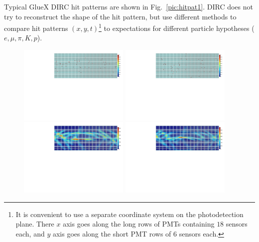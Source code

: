 Typical GlueX DIRC hit patterns are shown in Fig.~\ref{pic:hitpat1}. DIRC does not try to reconstruct the shape of the hit pattern, but use different methods to compare hit patterns $(x,y,t)$\footnote{It is convenient to use a separate coordinate system on the photodetection plane. There $x$ axis goes along the long rows of PMTs containing $18$ sensors each, and $y$ axis goes along the short PMT rows of $6$ sensors each.} to expectations for different particle hypotheses ($e, \mu, \pi, K, p$).

\begin{figure}[!h]
\centering
\includegraphics[angle=0,width=0.47\textwidth]{pics/single_ka_th8_phi158_p2.pdf} \hspace{0.5cm} \includegraphics[angle=0,width=0.47\textwidth]{pics/single_pi_th8_phi158_p2.pdf}\\
\includegraphics[angle=0,width=0.47\textwidth]{pics/ka_th8_phi158_p2.pdf} \hspace{0.5cm} \includegraphics[angle=0,width=0.47\textwidth]{pics/pi_th8_phi158_p2.pdf}

\end{figure}
